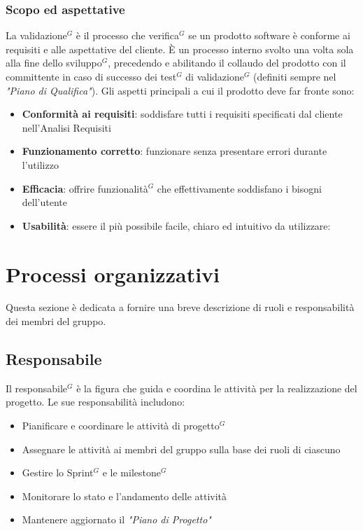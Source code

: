 \documentclass[a4paper,10pt]{article}
\begin{document}
\subsubsection{Scopo ed aspettative}
La validazione$^G$ è il processo che verifica$^G$ se un prodotto software è conforme ai requisiti e alle aspettative del cliente.
È un processo interno svolto una volta sola alla fine dello sviluppo$^G$, precedendo e abilitando il collaudo del prodotto con il committente
in caso di successo dei test$^G$ di validazione$^G$ (definiti sempre nel \textit{"Piano di Qualifica"}).
Gli aspetti principali a cui il prodotto deve far fronte sono:
\begin{itemize}
  \item \textbf{Conformità ai requisiti}: soddisfare tutti i requisiti specificati dal cliente nell'Analisi Requisiti
  \item \textbf{Funzionamento corretto}: funzionare senza presentare errori durante l'utilizzo 
  \item \textbf{Efficacia}: offrire funzionalità$^G$ che effettivamente soddisfano i bisogni dell'utente
  \item \textbf{Usabilità}: essere il più possibile facile, chiaro ed intuitivo da utilizzare:
\end{itemize}

\section{Processi organizzativi}
Questa sezione è dedicata a fornire una breve descrizione di ruoli e responsabilità dei membri del gruppo.
\subsection{Responsabile}
Il responsabile$^G$ è la figura che guida e coordina le attività per la realizzazione del progetto. Le sue responsabilità includono:
\begin{itemize}
  \item Pianificare e coordinare le attività di progetto$^G$
  \item Assegnare le attività ai membri del gruppo sulla base dei ruoli di ciascuno
  \item Gestire lo Sprint$^G$ e le milestone$^G$
  \item Monitorare lo stato e l'andamento delle attività
  \item Mantenere aggiornato il \textit{"Piano di Progetto"}
\end{itemize}
\end{document}
